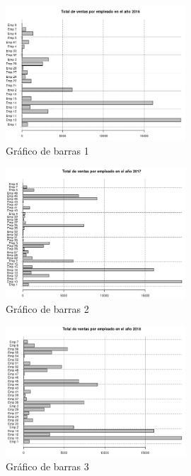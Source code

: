 \documentclass[12pt]{article}
\begin{document}
\begin{itemize}
                    \newpage
                    \begin{figure}[h]
                        \centering 
                        \includegraphics[width=0.6\textwidth]{img/grafico-barras-1.png}
                        \caption{Gráfico de barras 1}
                    \end{figure}

                    \begin{figure}[h]
                        \centering 
                        \includegraphics[width=0.6\textwidth]{img/grafico-barras-2.png}
                        \caption{Gráfico de barras 2}
                    \end{figure}

                    \newpage
                    \begin{figure}[h]
                        \centering 
                        \includegraphics[width=0.6\textwidth]{img/grafico-barras-3.png}
                        \caption{Gráfico de barras 3}
                    \end{figure}


\end{itemize}
\end{document}
